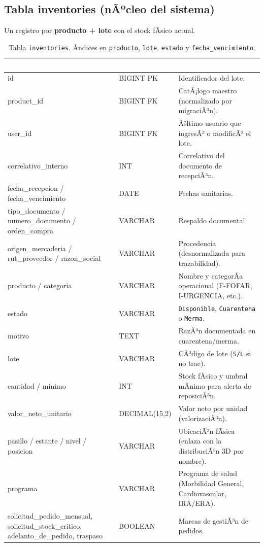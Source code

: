 ﻿\documentclass[a4paper, 12pt]{article}
\begin{document}
\subsection{Tabla inventories (nÃºcleo del sistema)}
Un registro por \textbf{producto + lote} con el stock fÃ­sico actual.
\begin{table}[H]
\centering
\small
\begin{tabularx}{\textwidth}{|l|l|X|}
\hline
\rowcolor{ucsblue} \textcolor{white}{\textbf{Columna}} & \textcolor{white}{\textbf{Tipo}} & \textcolor{white}{\textbf{DescripciÃ³n}} \\ \hline
id & BIGINT PK & Identificador del lote. \\ \hline
product\_id & BIGINT FK & CatÃ¡logo maestro (normalizado por migraciÃ³n). \\ \hline
user\_id & BIGINT FK & Ãšltimo usuario que ingresÃ³ o modificÃ³ el lote. \\ \hline
correlativo\_interno & INT & Correlativo del documento de recepciÃ³n. \\ \hline
fecha\_recepcion / fecha\_vencimiento & DATE & Fechas sanitarias. \\ \hline
tipo\_documento / numero\_documento / orden\_compra & VARCHAR & Respaldo documental. \\ \hline
origen\_mercaderia / rut\_proveedor / razon\_social & VARCHAR & Procedencia (desnormalizada para trazabilidad). \\ \hline
producto / categoria & VARCHAR & Nombre y categorÃ­a operacional (F-FOFAR, I-URGENCIA, etc.). \\ \hline
estado & VARCHAR & \texttt{Disponible}, \texttt{Cuarentena} o \texttt{Merma}. \\ \hline
motivo & TEXT & RazÃ³n documentada en cuarentena/merma. \\ \hline
lote & VARCHAR & CÃ³digo de lote (\texttt{S/L} si no trae). \\ \hline
cantidad / minimo & INT & Stock fÃ­sico y umbral mÃ­nimo para alerta de reposiciÃ³n. \\ \hline
valor\_neto\_unitario & DECIMAL(15,2) & Valor neto por unidad (valorizaciÃ³n). \\ \hline
pasillo / estante / nivel / posicion & VARCHAR & UbicaciÃ³n fÃ­sica (enlaza con la distribuciÃ³n 3D por nombre). \\ \hline
programa & VARCHAR & Programa de salud (Morbilidad General, Cardiovascular, IRA/ERA). \\ \hline
solicitud\_pedido\_mensual, solicitud\_stock\_critico, adelanto\_de\_pedido, traspaso & BOOLEAN & Marcas de gestiÃ³n de pedidos. \\ \hline
\end{tabularx}
\caption{Tabla \texttt{inventories}. Ãndices en \texttt{producto}, \texttt{lote}, \texttt{estado} y \texttt{fecha\_vencimiento}.}
\end{table}
\end{document}
